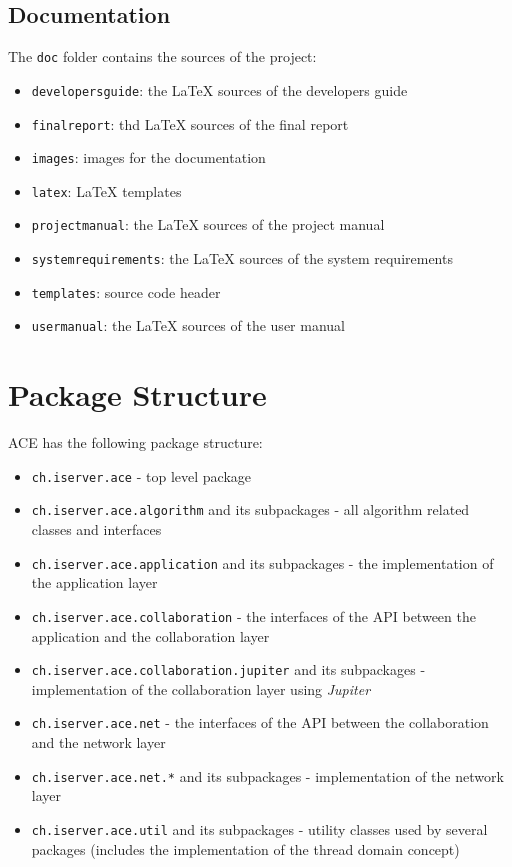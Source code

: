\documentclass[11pt,a4paper]{article}
\begin{document}
\subsection{Documentation}
The \texttt{doc} folder contains the sources of the project:

\begin{itemize}
 \item \texttt{developersguide}: the \LaTeX{} sources of the developers guide
 \item \texttt{finalreport}: thd \LaTeX{} sources of the final report
 \item \texttt{images}: images for the documentation
 \item \texttt{latex}: \LaTeX{} templates
 \item \texttt{projectmanual}: the \LaTeX{} sources of the project manual
 \item \texttt{systemrequirements}: the \LaTeX{} sources of the system requirements
 \item \texttt{templates}: source code header
 \item \texttt{usermanual}: the \LaTeX{} sources of the user manual
\end{itemize}



\section{Package Structure}
ACE has the following package structure:

\begin{itemize}
 \item \texttt{ch.iserver.ace} - top level package
 \item \texttt{ch.iserver.ace.algorithm} and its subpackages - all algorithm related classes and interfaces
 \item \texttt{ch.iserver.ace.application} and its subpackages - the implementation of the application layer
 \item \texttt{ch.iserver.ace.collaboration} - the interfaces of the API between the application and the collaboration layer
 \item \texttt{ch.iserver.ace.collaboration.jupiter} and its subpackages - implementation of the collaboration layer using \emph{Jupiter}
 \item \texttt{ch.iserver.ace.net} - the interfaces of the API between the collaboration and the network layer
 \item \texttt{ch.iserver.ace.net.*} and its subpackages - implementation of the network layer
 \item \texttt{ch.iserver.ace.util} and its subpackages - utility classes used by several packages (includes the implementation of the thread domain concept)
\end{itemize}
\end{document}
